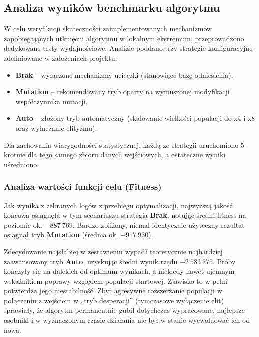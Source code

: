 \subsection{Analiza wyników benchmarku algorytmu}

W celu weryfikacji skuteczności zaimplementowanych mechanizmów zapobiegających utknięciu algorytmu w lokalnym ekstremum, przeprowadzono dedykowane testy wydajnościowe. Analizie poddano trzy strategie konfiguracyjne zdefiniowane w założeniach projektu:
\begin{itemize}
    \item \textbf{Brak} – wyłączone mechanizmy ucieczki (stanowiące bazę odniesienia),
    \item \textbf{Mutation} – rekomendowany tryb oparty na wymuszonej modyfikacji współczynnika mutacji,
    \item \textbf{Auto} – złożony tryb automatyczny (skalowanie wielkości populacji do x4 i x8 oraz wyłączanie elityzmu).
\end{itemize}

Dla zachowania wiarygodności statystycznej, każdą ze strategii uruchomiono 5-krotnie dla tego samego zbioru danych wejściowych, a ostateczne wyniki uśredniono.

\subsubsection{Analiza wartości funkcji celu (Fitness)}

Jak wynika z zebranych logów z przebiegu optymalizacji, najwyższą jakość końcową osiągnęła w tym scenariuszu strategia \textbf{Brak}, notując średni fitness na poziomie ok. $-887~769$. Bardzo zbliżony, niemal identycznie użyteczny rezultat osiągnął tryb \textbf{Mutation} (średnia ok. $-917~930$). 

Zdecydowanie najsłabiej w zestawieniu wypadł teoretycznie najbardziej zaawansowany tryb \textbf{Auto}, uzyskując średni wynik rzędu $-2~583~275$. Próby kończyły się na dalekich od optimum wynikach, a niekiedy nawet ujemnym wskaźnikiem poprawy względem populacji startowej. Zjawisko to w pełni potwierdza jego niestabilność. Zbyt agresywne rozszerzanie populacji w połączeniu z wejściem w „tryb desperacji” (tymczasowe wyłączenie elit) sprawiały, że algorytm permanentnie gubił dotychczas wypracowane, najlepsze osobniki i w wyznaczonym czasie działania nie był w stanie wyewoluować ich od nowa.

